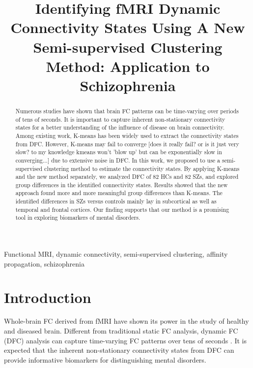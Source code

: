 \documentclass{article}
\title{Identifying fMRI Dynamic Connectivity States Using A New Semi-supervised Clustering Method: Application to Schizophrenia}
\begin{document}
\ninept

\maketitle

\begin{abstract}

Numerous studies have shown that brain \acl{FC} patterns can be time-varying over periods of tens of seconds. It is important to capture inherent non-stationary connectivity states for a better understanding of the influence of disease on brain connectivity. Among existing work, K-means has been widely used to extract the connectivity states from \ac{DFC}. However, K-means may fail to converge [does it really fail? or is it just very slow? to my knowledge kmeans won't 'blow up' but can be exponentially slow in converging...] due to extensive noise in \ac{DFC}. In this work, we proposed to use a semi-supervised clustering method to estimate the connectivity states. By applying K-means and the new method separately, we analyzed \ac{DFC} of 82 \aclp{HC} and 82 \aclp{SZ}, and explored group differences in the identified connectivity states. Results showed that the new approach found more and more meaningful group differences than K-means. The identified differences in \aclp{SZ} versus controls mainly lay in subcortical as well as temporal and frontal cortices. Our finding supports that our method is a promising tool in exploring biomarkers of mental disorders.

\end{abstract}

\begin{keywords}
Functional MRI, dynamic connectivity, semi-supervised clustering, affinity propagation, schizophrenia
\end{keywords}


\section{Introduction}
\label{sec:intro}

Whole-brain \ac{FC} derived from \ac{fMRI} have shown its power in the study of healthy and diseased brain. Different from traditional static \ac{FC} analysis, dynamic \ac{FC} (\acs{DFC}) analysis can capture time-varying \ac{FC} patterns over tens of seconds \cite{allen_tracking_2014} \cite{calhoun_chronnectome:_2014} \cite{damaraju_dynamic_2014} \cite{du_group_2015} \cite{du_interaction_2016} \cite{rashid_dynamic_2014}. It is expected that the inherent non-stationary connectivity states from \ac{DFC} can provide informative biomarkers for distinguishing mental disorders.
\end{document}
